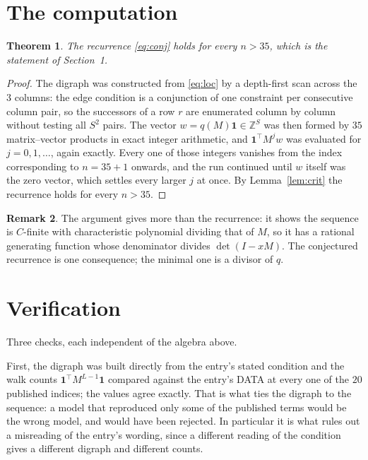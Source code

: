 \documentclass[11pt,a4paper]{article}
\theoremstyle{plain}
\newtheorem{theorem}{Theorem}
\theoremstyle{definition}
\newtheorem{remark}[theorem]{Remark}
\begin{document}
\section{The computation}

\begin{theorem}
The recurrence \eqref{eq:conj} holds for every $n>35$, which is the statement of
Section~1.
\end{theorem}

\begin{proof}
The digraph was constructed from \eqref{eq:loc} by a depth-first scan across the $3$
columns: the edge condition is a conjunction of one constraint per consecutive column
pair, so the successors of a row $r$ are enumerated column by column without testing all
$S^2$ pairs. The vector $w=q(M)\mathbf{1}\in\mathbb{Z}^{S}$ was then formed by $35$
matrix--vector products in exact integer arithmetic, and $\mathbf{1}^{\!\top}M^{j}w$ was
evaluated for $j=0,1,\dots$, again exactly. Every one of those integers vanishes from the
index corresponding to $n=35+1$ onwards, and the run continued until $w$ itself was the
zero vector, which settles every larger $j$ at once. By Lemma~\ref{lem:crit} the recurrence
holds for every $n>35$.
\end{proof}

\begin{remark}
The argument gives more than the recurrence: it shows the sequence is $C$-finite with
characteristic polynomial dividing that of $M$, so it has a rational generating function
whose denominator divides $\det(I-xM)$. The conjectured recurrence is one consequence; the
minimal one is a divisor of $q$.
\end{remark}

\section{Verification}

Three checks, each independent of the algebra above.

First, the digraph was built directly from the entry's stated condition and the walk counts
$\mathbf{1}^{\!\top}M^{L-1}\mathbf{1}$ compared against the entry's DATA at
every one of the $20$ published indices; the values agree exactly. That is what ties
the digraph to the sequence: a model that reproduced only some of the published terms would
be the wrong model, and would have been rejected. In particular it is what rules out a
misreading of the entry's wording, since a different reading of the condition gives a
different digraph and different counts.
\end{document}
